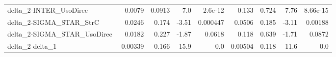 \begin{tabular}{lrrrrrrrr}
delta\_2-INTER\_UsoDirec               &      0.0079 &       0.0913 &     7.0 &  2.6e-12 &      0.133 &       0.724 &         7.76 &      8.66e-15 \\
delta\_2-SIGMA\_STAR\_StrC              &      0.0246 &        0.174 &   -3.51 & 0.000447 &     0.0506 &       0.185 &        -3.11 &       0.00188 \\
delta\_2-SIGMA\_STAR\_UsoDirec          &      0.0182 &        0.227 &   -1.87 &   0.0618 &      0.118 &       0.639 &        -1.71 &        0.0872 \\
delta\_2-delta\_1                      &    -0.00339 &       -0.166 &    15.9 &      0.0 &    0.00504 &       0.118 &         11.6 &           0.0 \\
\bottomrule
\end{tabular}
